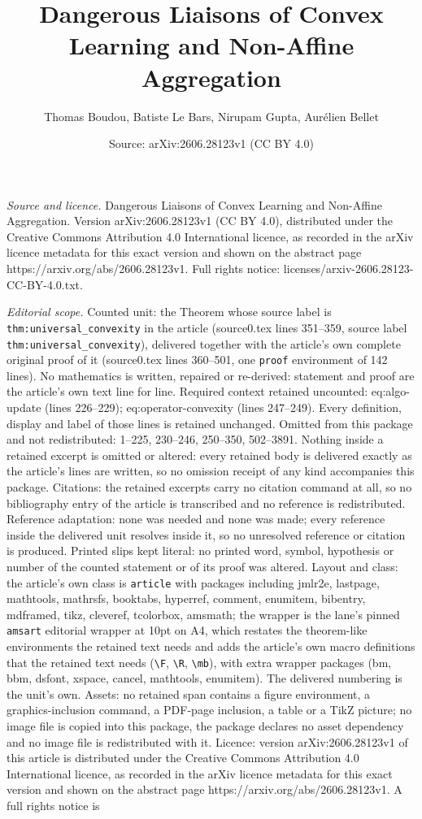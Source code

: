 \documentclass[10pt,a4paper]{amsart}
\title[Dangerous Liaisons of Convex Learning and Non-Affine Aggrega]{Dangerous Liaisons of Convex Learning and Non-Affine Aggregation}
\author{Thomas Boudou, Batiste Le Bars, Nirupam Gupta, Aur\'elien Bellet}
\date{Source: arXiv:2606.28123v1 (CC BY 4.0)}
\begin{document}
\maketitle

\noindent\emph{Source and licence.} Dangerous Liaisons of Convex Learning and Non-Affine Aggregation. Version arXiv:2606.28123v1 (CC BY 4.0), distributed under the Creative Commons Attribution 4.0 International licence, as recorded in the arXiv licence metadata for this exact version and shown on the abstract page https://arxiv.org/abs/2606.28123v1. Full rights notice: licenses/arxiv-2606.28123-CC-BY-4.0.txt.\par\smallskip

\noindent\textit{Editorial scope.} Counted unit: the Theorem whose source label is \texttt{thm:universal\_convexity} in the article (source0.tex lines 351--359, source label \texttt{thm:universal\_convexity}), delivered together with the article's own complete original proof of it (source0.tex lines 360--501, one \texttt{proof} environment of 142 lines). No mathematics is written, repaired or re-derived: statement and proof are the article's own text line for line. Required context retained uncounted: eq:algo-update (lines 226--229); eq:operator-convexity (lines 247--249). Every definition, display and label of those lines is retained unchanged. Omitted from this package and not redistributed: 1--225, 230--246, 250--350, 502--3891. Nothing inside a retained excerpt is omitted or altered: every retained body is delivered exactly as the article's lines are written, so no omission receipt of any kind accompanies this package. Citations: the retained excerpts carry no citation command at all, so no bibliography entry of the article is transcribed and no reference is redistributed. Reference adaptation: none was needed and none was made; every reference inside the delivered unit resolves inside it, so no unresolved reference or citation is produced. Printed slips kept literal: no printed word, symbol, hypothesis or number of the counted statement or of its proof was altered. Layout and class: the article's own class is \texttt{article} with packages including jmlr2e, lastpage, mathtools, mathrsfs, booktabs, hyperref, comment, enumitem, bibentry, mdframed, tikz, cleveref, tcolorbox, amsmath; the wrapper is the lane's pinned \texttt{amsart} editorial wrapper at 10pt on A4, which restates the theorem-like environments the retained text needs and adds the article's own macro definitions that the retained text needs (\texttt{\textbackslash F}, \texttt{\textbackslash R}, \texttt{\textbackslash mb}), with extra wrapper packages (bm, bbm, dsfont, xspace, cancel, mathtools, enumitem). The delivered numbering is the unit's own. Assets: no retained span contains a figure environment, a graphics-inclusion command, a PDF-page inclusion, a table or a TikZ picture; no image file is copied into this package, the package declares no asset dependency and no image file is redistributed with it. Licence: version arXiv:2606.28123v1 of this article is distributed under the Creative Commons Attribution 4.0 International licence, as recorded in the arXiv licence metadata for this exact version and shown on the abstract page https://arxiv.org/abs/2606.28123v1. A full rights notice is 
\end{document}
